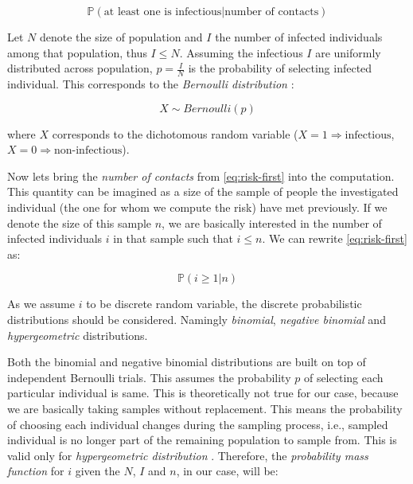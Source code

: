 \documentclass[
  digital, %
  oneside, %
  lof,     %
  lot,     %
]{fithesis4}
\begin{document}
\begin{equation}\label{eq:risk-first}
  \mathbb{P}(\text{at least one is infectious} | \text{number of contacts})
\end{equation}

Let $N$ denote the size of population and $I$ the number of infected
individuals among that population, thus $I \leq N$.
Assuming the infectious $I$ are uniformly distributed
across population, $p = \frac{I}{N}$ is the probability of
selecting infected individual.
This corresponds to the \textit{Bernoulli 
distribution} \cite{bernoulli-dist}:

\begin{equation}
  X \sim Bernoulli \left( p \right)
\end{equation}

where $X$ corresponds to the dichotomous random variable
($X = 1 \Rightarrow \text{infectious}$, $X = 0 \Rightarrow \text{non-infectious}$).

Now lets bring the \textit{number of contacts} from 
\eqref{eq:risk-first} into the computation.
This quantity can be imagined as a size of the sample of people
the investigated individual (the one for whom we compute the risk)
have met previously.
If we denote the size of this sample $n$, we are basically interested
in the number of infected individuals $i$ in that sample such 
that $i \leq n$. We can rewrite \eqref{eq:risk-first} as:

\begin{equation}\label{eq:risk-second}
  \mathbb{P}(i \geq 1 | n)
\end{equation}

As we assume $i$ to be discrete random variable,
the discrete probabilistic distributions should be considered.
Namingly \textit{binomial}, \textit{negative binomial} and 
\textit{hypergeometric} distributions.

Both the binomial and negative binomial distributions
are built on top of independent Bernoulli trials.
This assumes the probability $p$ of selecting each particular
individual is same.
This is theoretically not true for our case, because we
are basically taking samples without replacement.
This means the probability of choosing each individual
changes during the sampling process, i.e., sampled 
individual is no longer part of the remaining
population to sample from. This is valid only for
\textit{hypergeometric distribution} \cite{hypergeometric-dist}.
Therefore, the \textit{probability mass function} for $i$ given the
$N$, $I$ and $n$, in our case, will be:
\end{document}
